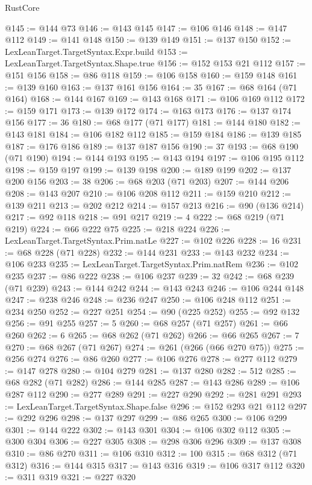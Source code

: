 \begin{lexlean}{RustCore}
\begin{coremodule}
@145 := @144 @73
@146 := @143 @145
@147 := @106 @146
@148 := @147 @112
@149 := @141 @148
@150 := @139 @149
@151 := @137 @150
@152 := LexLeanTarget.TargetSyntax.Expr.build
@153 := LexLeanTarget.TargetSyntax.Shape.true
@156 := @152 @153 @21 @112
@157 := @151 @156
@158 := @86 @118
@159 := @106 @158
@160 := @159 @148
@161 := @139 @160
@163 := @137 @161 @156
@164 := 35
@167 := @68 @164 (@71 @164)
@168 := @144 @167
@169 := @143 @168
@171 := @106 @169 @112
@172 := @159 @171
@173 := @139 @172
@174 := @163 @173
@176 := @137 @174 @156
@177 := 36
@180 := @68 @177 (@71 @177)
@181 := @144 @180
@182 := @143 @181
@184 := @106 @182 @112
@185 := @159 @184
@186 := @139 @185
@187 := @176 @186
@189 := @137 @187 @156
@190 := 37
@193 := @68 @190 (@71 @190)
@194 := @144 @193
@195 := @143 @194
@197 := @106 @195 @112
@198 := @159 @197
@199 := @139 @198
@200 := @189 @199
@202 := @137 @200 @156
@203 := 38
@206 := @68 @203 (@71 @203)
@207 := @144 @206
@208 := @143 @207
@210 := @106 @208 @112
@211 := @159 @210
@212 := @139 @211
@213 := @202 @212
@214 := @157 @213
@216 := @90 (@136 @214)
@217 := @92 @118
@218 := @91 @217
@219 := 4
@222 := @68 @219 (@71 @219)
@224 := @66 @222 @75
@225 := @218 @224
@226 := LexLeanTarget.TargetSyntax.Prim.natLe
@227 := @102 @226
@228 := 16
@231 := @68 @228 (@71 @228)
@232 := @144 @231
@233 := @143 @232
@234 := @106 @233
@235 := LexLeanTarget.TargetSyntax.Prim.natRem
@236 := @102 @235
@237 := @86 @222
@238 := @106 @237
@239 := 32
@242 := @68 @239 (@71 @239)
@243 := @144 @242
@244 := @143 @243
@246 := @106 @244 @148
@247 := @238 @246
@248 := @236 @247
@250 := @106 @248 @112
@251 := @234 @250
@252 := @227 @251
@254 := @90 (@225 @252)
@255 := @92 @132
@256 := @91 @255
@257 := 5
@260 := @68 @257 (@71 @257)
@261 := @66 @260
@262 := 6
@265 := @68 @262 (@71 @262)
@266 := @66 @265
@267 := 7
@270 := @68 @267 (@71 @267)
@274 := @261 (@266 (@66 @270 @75))
@275 := @256 @274
@276 := @86 @260
@277 := @106 @276
@278 := @277 @112
@279 := @147 @278
@280 := @104 @279
@281 := @137 @280
@282 := 512
@285 := @68 @282 (@71 @282)
@286 := @144 @285
@287 := @143 @286
@289 := @106 @287 @112
@290 := @277 @289
@291 := @227 @290
@292 := @281 @291
@293 := LexLeanTarget.TargetSyntax.Shape.false
@296 := @152 @293 @21 @112
@297 := @292 @296
@298 := @137 @297
@299 := @86 @265
@300 := @106 @299
@301 := @144 @222
@302 := @143 @301
@304 := @106 @302 @112
@305 := @300 @304
@306 := @227 @305
@308 := @298 @306 @296
@309 := @137 @308
@310 := @86 @270
@311 := @106 @310
@312 := 100
@315 := @68 @312 (@71 @312)
@316 := @144 @315
@317 := @143 @316
@319 := @106 @317 @112
@320 := @311 @319
@321 := @227 @320

\end{coremodule}
\end{lexlean}
